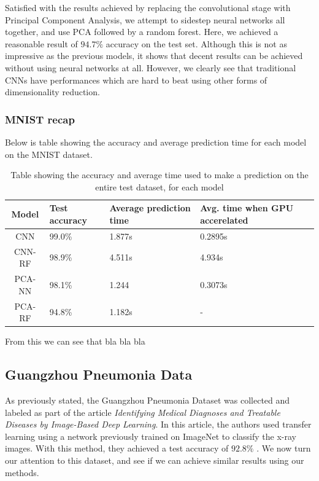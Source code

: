 \documentclass[onecolumn,10pt,cleanfoot]{asme2ej}
\begin{document}
Satisfied with the results achieved by replacing the convolutional stage with Principal Component Analysis, we attempt to sidestep neural networks all together, and use PCA followed by a random forest. Here, we achieved a reasonable result of $94.7\%$ accuracy on the test set. Although this is not as impressive as the previous models, it shows that decent results can be achieved without using neural networks at all. However, we clearly see that traditional CNNs have performances which are hard to beat using other forms of dimensionality reduction.

\subsubsection{MNIST recap}

Below is table showing the accuracy and average prediction time for each model on the MNIST dataset.

\begin{table}[H]
\caption{Table showing the accuracy and average time used to make a prediction on the entire test dataset, for each model}
\begin{center}
\label{modcompmnist}
\begin{tabular}{| c | l | l | l |}
\hline
Model & Test accuracy & Average prediction time & Avg. time when GPU accerelated \\
\hline
CNN & 99.0\% & 1.877s & 0.2895s \\
CNN-RF & 98.9\% & 4.511s & 4.934s \\
PCA-NN & 98.1\% & 1.244 & 0.3073s \\
PCA-RF & 94.8\% & 1.182s & - \\
\hline
\end{tabular}
\end{center}
\end{table}

From this we can see that bla bla bla

\subsection{Guangzhou Pneumonia Data}

As previously stated, the Guangzhou Pneumonia Dataset was collected and labeled as part of the article {\it Identifying Medical Diagnoses and Treatable Diseases by Image-Based Deep Learning}. In this article, the authors used transfer learning using a network previously trained on ImageNet to classify the x-ray images. With this method, they achieved a test accuracy of $92.8\%$ \cite[1127]{xray}. We now turn our attention to this dataset, and see if we can achieve similar results using our methods.
\end{document}
